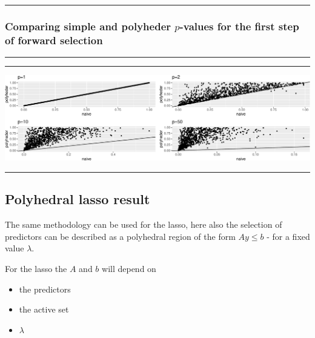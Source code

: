 \documentclass[
  letterpaper,
  DIV=11,
  numbers=noendperiod]{scrartcl}
\providecommand{\tightlist}{%
  \setlength{\itemsep}{0pt}\setlength{\parskip}{0pt}}\usepackage{longtable,booktabs,array}
\begin{document}
\begin{center}\rule{0.5\linewidth}{0.5pt}\end{center}

\hypertarget{comparing-simple-and-polyheder-p-values-for-the-first-step-of-forward-selection}{%
\subsubsection{\texorpdfstring{Comparing simple and polyheder
\(p\)-values for the first step of forward
selection}{Comparing simple and polyheder p-values for the first step of forward selection}}\label{comparing-simple-and-polyheder-p-values-for-the-first-step-of-forward-selection}}

\begin{center}\rule{0.5\linewidth}{0.5pt}\end{center}

\begin{center}\rule{0.5\linewidth}{0.5pt}\end{center}

\includegraphics{W6_files/figure-pdf/unnamed-chunk-44-1.pdf}

\begin{center}\rule{0.5\linewidth}{0.5pt}\end{center}

\hypertarget{polyhedral-lasso-result}{%
\subsection{Polyhedral lasso result}\label{polyhedral-lasso-result}}

The same methodology can be used for the lasso, here also the selection
of predictors can be described as a polyhedral region of the form
\(Ay\le b\) - for a fixed value \(\lambda\).

For the lasso the \(A\) and \(b\) will depend on

\begin{itemize}
\tightlist
\item
  the predictors
\item
  the active set
\item
  \(\lambda\)
\end{itemize}
\end{document}
